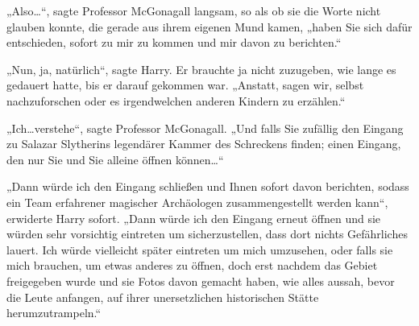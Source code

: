 „Also…“, sagte Professor McGonagall langsam, so als ob sie die Worte nicht glauben konnte, die gerade aus ihrem eigenen Mund kamen, „haben Sie sich dafür entschieden, sofort zu mir zu kommen und mir davon zu berichten.“

„Nun, ja, natürlich“, sagte Harry. Er brauchte ja nicht zuzugeben, wie lange es gedauert hatte, bis er darauf gekommen war. „Anstatt, sagen wir, selbst nachzuforschen oder es irgendwelchen anderen Kindern zu erzählen.“

„Ich…verstehe“, sagte Professor McGonagall. „Und falls Sie zufällig den Eingang zu Salazar Slytherins legendärer Kammer des Schreckens finden; einen Eingang, den nur Sie und Sie alleine öffnen können…“

„Dann würde ich den Eingang schließen und Ihnen sofort davon berichten, sodass ein Team erfahrener magischer Archäologen zusammengestellt werden kann“, erwiderte Harry sofort. „Dann würde ich den Eingang erneut öffnen und sie würden sehr vorsichtig eintreten um sicherzustellen, dass dort nichts Gefährliches lauert. Ich würde vielleicht später eintreten um mich umzusehen, oder falls sie mich brauchen, um etwas anderes zu öffnen, doch erst nachdem das Gebiet freigegeben wurde und sie Fotos davon gemacht haben, wie alles aussah, bevor die Leute anfangen, auf ihrer unersetzlichen historischen Stätte herumzutrampeln.“



